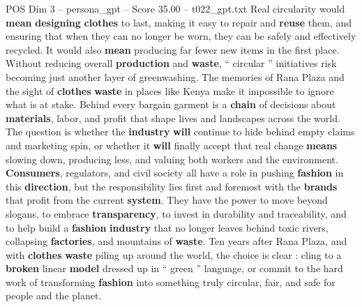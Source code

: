 \begin{textsample}{POS Dim 3 – persona\_gpt – Score 35.00 – t022\_gpt.txt}
Real circularity would \textbf{mean} \textbf{designing} \textbf{clothes} to last, making it easy to repair and \textbf{reuse} them, and ensuring that when they can no longer be worn, they can be safely and effectively recycled.
It would also \textbf{mean} producing far fewer new items in the first place.
Without reducing overall \textbf{production} and \textbf{waste}, “ circular ” initiatives risk becoming just another layer of greenwashing.
The memories of Rana Plaza and the sight of \textbf{clothes} \textbf{waste} in places like Kenya make it impossible to ignore what is at stake.
Behind every bargain garment is a \textbf{chain} of decisions about \textbf{materials}, labor, and profit that shape lives and landscapes across the world.
The question is whether the \textbf{industry} \textbf{will} continue to hide behind empty claims and marketing spin, or whether it \textbf{will} finally accept that real change \textbf{means} slowing down, producing less, and valuing both workers and the environment. \textbf{Consumers}, regulators, and civil society all have a role in pushing \textbf{fashion} in this \textbf{direction}, but the responsibility lies first and foremost with the \textbf{brands} that profit from the current \textbf{system}.
They have the power to move beyond slogans, to embrace \textbf{transparency}, to invest in durability and traceability, and to help build a \textbf{fashion} \textbf{industry} that no longer leaves behind toxic rivers, collapsing \textbf{factories}, and mountains of \textbf{waste}.
Ten years after Rana Plaza, and with \textbf{clothes} \textbf{waste} piling up around the world, the choice is clear : cling to a \textbf{broken} linear \textbf{model} dressed up in “ green ” language, or commit to the hard work of transforming \textbf{fashion} into something truly circular, fair, and safe for people and the planet.

\end{textsample}
